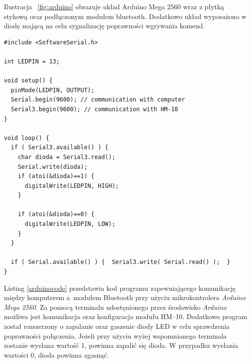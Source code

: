 Ilustracja ~\ref{fig:arduino} obrazuje układ Arduino Mega 2560 wraz z płytką stykową oraz podłączonym modułem bluetooth. Dodatkowo układ wyposażono w diodę mającą na celu sygnalizację poprawności wgrywania komend.

\begin{minipage}{\textwidth}
	\begin{lstlisting}[label=arduinocode,caption=Kod programu umożliwiającego konifugrację modułu Bluetooth HM–10.]
#include <SoftwareSerial.h>
 
int LEDPIN = 13;

void setup() {
  pinMode(LEDPIN, OUTPUT);
  Serial.begin(9600); // communication with computer
  Serial3.begin(9600); // communication with HM-10  
}
 
void loop() {
  if ( Serial3.available() ) {
    char dioda = Serial3.read();
    Serial.write(dioda);
    if (atoi(&dioda)==1) {
      digitalWrite(LEDPIN, HIGH);
    }
    
    if (atoi(&dioda)==0) {
      digitalWrite(LEDPIN, LOW);
    }
  }
  
  if ( Serial.available() ) {  Serial3.write( Serial.read() );  }  
}
	\end{lstlisting}
\end{minipage}
 
Listing \ref{arduinocode} przedstawia kod programu zapewniającego komunikację między komputerem a~modułem Bluetooth przy użyciu mikrokontrolera \textit{Arduino Mega 2560}.  Za pomocą terminalu udostęnionego przez środowisko \textit{Arduino} możliwa jest komunikacja oraz konfiguracja modułu HM–10. Dodatkowo program został rozszerzony o zapalanie oraz gaszenie diody LED w celu sprawdzenia poprawności połączenia. Jeżeli przy użyciu wyżej wspomnianego terminala zostanie wysłana wartość 1, powinna zapalić się dioda. W przypadku wysłania wartości 0, dioda powinna zgasnąć.


 
